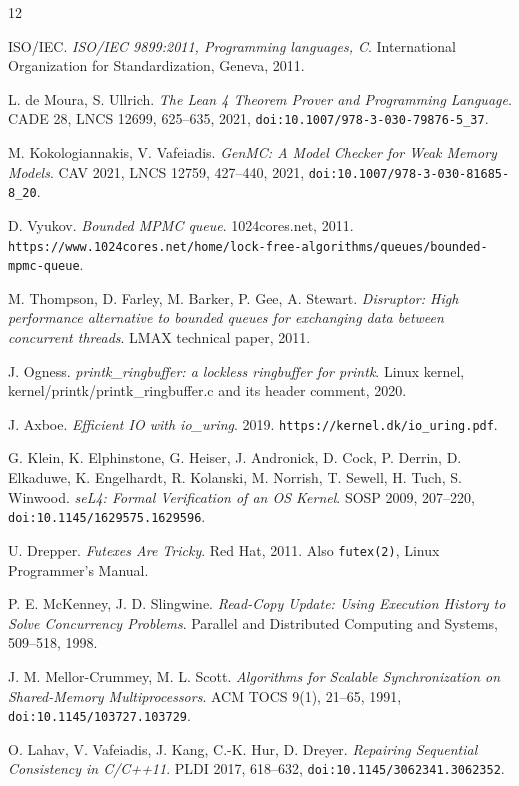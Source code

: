 \backmatter
{}
\begin{thebibliography}{12}

ISO/IEC. \emph{ISO/IEC 9899:2011, Programming languages, C}. International Organization for Standardization, Geneva, 2011.

L. de Moura, S. Ullrich. \emph{The Lean 4 Theorem Prover and Programming Language}. CADE 28, LNCS 12699, 625--635, 2021, \texttt{doi:10.1007/\allowbreak{}978-3-030-79876-5\_37}.

M. Kokologiannakis, V. Vafeiadis. \emph{GenMC: A Model Checker for Weak Memory Models}. CAV 2021, LNCS 12759, 427--440, 2021, \texttt{doi:10.1007/\allowbreak{}978-3-030-81685-8\_20}.

D. Vyukov. \emph{Bounded MPMC queue}. 1024cores.net, 2011. \texttt{https:/\allowbreak{}/\allowbreak{}www.1024cores.net/\allowbreak{}home/\allowbreak{}lock-free-algorithms/\allowbreak{}queues/\allowbreak{}bounded-mpmc-queue}.

M. Thompson, D. Farley, M. Barker, P. Gee, A. Stewart. \emph{Disruptor: High performance alternative to bounded queues for exchanging data between concurrent threads}. LMAX technical paper, 2011.

J. Ogness. \emph{printk\_ringbuffer: a lockless ringbuffer for printk}. Linux kernel, kernel/printk/printk\_ringbuffer.c and its header comment, 2020.

J. Axboe. \emph{Efficient IO with io\_uring}. 2019. \texttt{https:/\allowbreak{}/\allowbreak{}kernel.dk/\allowbreak{}io\_uring.pdf}.

G. Klein, K. Elphinstone, G. Heiser, J. Andronick, D. Cock, P. Derrin, D. Elkaduwe, K. Engelhardt, R. Kolanski, M. Norrish, T. Sewell, H. Tuch, S. Winwood. \emph{seL4: Formal Verification of an OS Kernel}. SOSP 2009, 207--220, \texttt{doi:10.1145/\allowbreak{}1629575.1629596}.

U. Drepper. \emph{Futexes Are Tricky}. Red Hat, 2011. Also \texttt{futex(2)}, Linux Programmer's Manual.

P. E. McKenney, J. D. Slingwine. \emph{Read-Copy Update: Using Execution History to Solve Concurrency Problems}. Parallel and Distributed Computing and Systems, 509--518, 1998.

J. M. Mellor-Crummey, M. L. Scott. \emph{Algorithms for Scalable Synchronization on Shared-Memory Multiprocessors}. ACM TOCS 9(1), 21--65, 1991, \texttt{doi:10.1145/\allowbreak{}103727.103729}.

O. Lahav, V. Vafeiadis, J. Kang, C.-K. Hur, D. Dreyer. \emph{Repairing Sequential Consistency in C/C++11}. PLDI 2017, 618--632, \texttt{doi:10.1145/\allowbreak{}3062341.3062352}.

\end{thebibliography}
